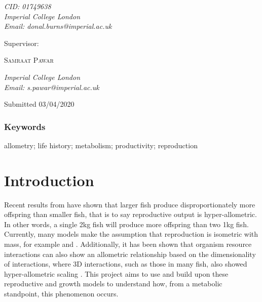 \begin{titlepage}
	\textit{CID: 01749638 \\ Imperial College London \\ Email: donal.burns@imperial.ac.uk} %
	
	\vspace*{2\baselineskip} %
	

	
	Supervisor:
	
	
	\vspace{0.5\baselineskip} %
	
	{\scshape\Large Samraat Pawar \\} %
	
	\vspace{0.5\baselineskip} %
	
	\textit{Imperial College London \\ Email: s.pawar@imperial.ac.uk} %
	
	\vspace{3cm} %
	
	
	\crest %
	
	\vspace{0.3\baselineskip} %
	
	Submitted 03/04/2020 %
	

\end{titlepage}


\linenumbers

\subsubsection*{Keywords}
allometry; life history; metabolism; productivity;  reproduction

\section*{Introduction}
Recent results from \cite{Barneche2018} have shown that larger fish produce disproportionately more offspring than smaller fish, that is to say reproductive output is hyper-allometric.  In other words, a single 2kg fish will produce more offspring than two 1kg fish.  Currently, many models make the assumption that reproduction is isometric with mass, for example \cite{Charnov2001} and \cite{West2001}.  Additionally, it has been shown that organism resource interactions can also show an allometric relationship based on the dimensionality of interactions, where 3D interactions, such as those in many fish, also showed hyper-allometric scaling \citep{Pawar2012}. 
This project aims to use and build upon these reproductive and growth models to understand how, from a metabolic standpoint, this phenomenon occurs.
